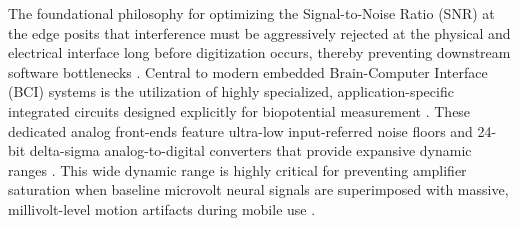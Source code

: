 The foundational philosophy for optimizing the Signal-to-Noise Ratio (SNR) at the edge posits that interference must be aggressively rejected at the physical and electrical interface long before digitization occurs, thereby preventing downstream software bottlenecks \cite{xu2025analog}. Central to modern embedded Brain-Computer Interface (BCI) systems is the utilization of highly specialized, application-specific integrated circuits designed explicitly for biopotential measurement \cite{han2022wide}. These dedicated analog front-ends feature ultra-low input-referred noise floors and 24-bit delta-sigma analog-to-digital converters that provide expansive dynamic ranges \cite{chen2022124}. This wide dynamic range is highly critical for preventing amplifier saturation when baseline microvolt neural signals are superimposed with massive, millivolt-level motion artifacts during mobile use \cite{pochet2022pseudo}.

